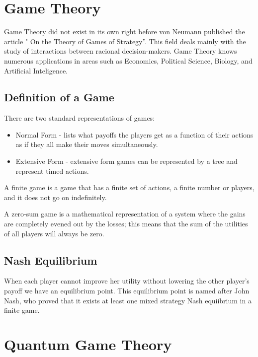\section{Game Theory}
\label{sec:background:game_theory}

Game Theory did not exist in its own right before von Neumann published the article " On the Theory of Games of Strategy''. This field deals mainly with the study of interactions between racional decision-makers. Game Theory knows numerous applications in areas such as Economics, Political Science, Biology, and Artificial Inteligence. 

\subsection{Definition of a Game}
\label{subsec:background:game_theory_definition}

There are two standard representations of games:
\begin{itemize}
\item Normal Form - lists what payoffs the players get as a function of their actions as if they all make their moves simultaneously. 
\item Extensive Form - extensive form games can be represented by a tree and represent timed actions.
\end{itemize}

A finite game is a game that has a finite set of actions, a finite number or players, and it does not go on indefinitely.

A zero-sum game is a mathematical representation of a system where the gains are completely evened out by the losses; this means that the sum of the utilities of all players will always be zero.



\subsection{Nash Equilibrium}
\label{subsec:background:game_theory_nash_equilibrium}

When each player cannot improve her utility without lowering the other player's payoff we have an equilibrium point. This equilibrium point is named after John Nash, who proved that it exists at least one mixed strategy Nash equiibrium in a finite game.






\section{Quantum Game Theory}
\label{sec:background_quantum_game_theory}

